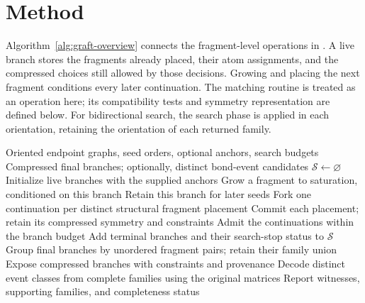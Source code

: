 \section{Method}


Algorithm~\ref{alg:graft-overview} connects the fragment-level operations in . A live branch stores the fragments already placed, their atom assignments, and the compressed choices still allowed by those decisions. Growing and placing the next fragment conditions every later continuation. The matching routine is treated as an operation here; its compatibility tests and symmetry representation are defined below. For bidirectional search, the search phase is applied in each orientation, retaining the orientation of each returned family.

\begin{algorithm}[t]
\caption{GRAFT: from fragment growth to alternative bond-event candidates}
\label{alg:graft-overview}
\small
\begin{algorithmic}[1]
\REQUIRE Oriented endpoint graphs, seed orders, optional anchors, search budgets
\ENSURE Compressed final branches; optionally, distinct bond-event candidates
\STATE $\mathcal S\gets\varnothing$ 
    \STATE Initialize live branches with the supplied anchors
    \REPEAT
          \STATE Grow a fragment to saturation, conditioned on this branch 
            \STATE Retain this branch for later seeds
          \ELSE
            \STATE Fork one continuation per distinct structural fragment placement
            \STATE Commit each placement; retain its compressed symmetry and constraints
            \STATE Admit the continuations within the branch budget
          \ENDIF
        \ENDFOR
      \ENDFOR
    \STATE Add terminal branches and their search-stop status to $\mathcal S$
  \ENDFOR
\ENDFOR
\STATE Group final branches by unordered fragment pairs; retain their family union
\STATE Expose compressed branches with constraints and provenance
  \STATE Decode distinct event classes from complete families using the original matrices
  \STATE Report witnesses, supporting families, and completeness status 
\ENDIF
\end{algorithmic}
\end{algorithm}

